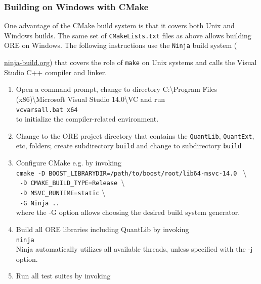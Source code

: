 \documentclass[12pt, a4paper]{article}
\begin{document}
\subsubsection*{Building on Windows with CMake}

One advantage of the CMake build system is that it covers both Unix and Windows builds. 
The same set of {\tt CMakeLists.txt} files as above allows building ORE on Windows. The following instructions use the {\tt Ninja} build system ({\url{ninja-build.org}) that covers the role of {\tt make} on Unix systems and calls the Visual Studio C++ compiler and linker. 

\begin{enumerate}
\item Open a command prompt, change to directory C:{\textbackslash}Program Files (x86){\textbackslash}Microsoft Visual Studio 14.0{\textbackslash}VC and run\\
\medskip
{\tt vcvarsall.bat x64} \\
\medskip
to initialize the compiler-related environment.
\item Change to the ORE project directory that contains the {\tt QuantLib}, {\tt QuantExt}, etc, folders; create subdirectory {\tt build} and change to subdirectory {\tt build}
\item Configure CMake e.g. by invoking \\
\medskip
{\tt cmake -D BOOST\_LIBRARYDIR=/path/to/boost/root/lib64-msvc-14.0 } \textbackslash\\
{\tt \hspace{2cm} -D CMAKE\_BUILD\_TYPE=Release }\textbackslash\\
{\tt \hspace{2cm} -D MSVC\_RUNTIME=static} \textbackslash\\
{\tt \hspace{2cm} -G Ninja ..} \\
\medskip
where the -G option allows choosing the desired build system generator.
\item Build all ORE libraries including QuantLib by invoking \\
\medskip
  {\tt ninja} \\
\medskip
Ninja automatically utilizes all available threads, unless specified with the -j option.

\item Run all test suites by invoking \\
\end{enumerate}

}
\end{document}
